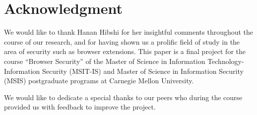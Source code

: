 \documentclass[conference]{IEEEtran}
\begin{document}
\section*{Acknowledgment}
We would like to thank Hanan Hibshi for her insightful comments throughout the course of our research, and for having shown us a prolific field of study in the area of security such as browser extensions. This paper is a final project for the course ``Browser Security'' of the Master of Science in Information Technology-Information Security (MSIT-IS) and Master of Science in Information Security (MSIS) postgraduate programs at Carnegie Mellon University. 

We would like to dedicate a special thanks to our peers who during the course provided us with feedback to improve the project.



\end{document}
